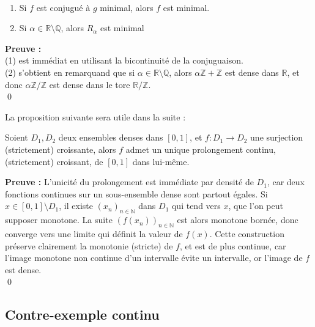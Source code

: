 \documentclass[11pt,a4paper]{article}
\begin{document}
\label{prop:mini}
\begin{proposition} ~ 
\begin{enumerate}
\item Si $f$ est conjugué à $g$ minimal, alors $f$ est minimal.
\item Si $\alpha \in \mathbb{R} \setminus \mathbb{Q}$, alors $R_\alpha$ est minimal
\end{enumerate}
\end{proposition}

\textbf{Preuve :} \\ 
(1) est immédiat en utilisant la bicontinuité de la conjuguaison. \\
(2) s'obtient en remarquand que si $\alpha \in \mathbb{R} \setminus \mathbb{Q}$, alors $\alpha\mathbb{Z} + \mathbb{Z}$ est dense dans $\mathbb{R}$, et donc $\alpha\mathbb{Z}/\mathbb{Z}$ est dense dans le tore $\mathbb{R}/\mathbb{Z}$. \\ \qed

La proposition suivante sera utile dans la suite :

\label{prop:dense}
\begin{proposition}
Soient $D_1,D_2$ deux ensembles denses dans $[0,1]$, et $f : D_1 \to D_2$ une surjection (strictement) croissante, alors $f$ admet un unique prolongement continu, (strictement) croissant, de $[0,1]$ dans lui-même.
\end{proposition}

\textbf{Preuve :} L'unicité du prolongement est immédiate par densité de $D_1$, car deux fonctions continues sur un sous-ensemble dense sont partout égales. Si $x\in [0,1]\setminus D_1$, il existe $(x_n)_{n\in \mathbb{N}}$ dans $D_1$ qui tend vers $x$, que l'on peut supposer monotone. La suite $(f(x_n))_{n\in\mathbb{N}}$ est alors monotone bornée, donc converge vers une limite qui définit la valeur de $f(x)$.
Cette construction préserve clairement la monotonie (stricte) de $f$, et est de plus continue, car l'image monotone non continue d'un intervalle évite un intervalle, or l'image de $f$ est dense. \\ \qed

\subsection{Contre-exemple continu} 
\end{document}
